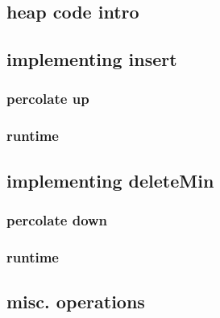 \subsection{heap code intro}



\subsection{implementing insert}



\subsubsection{percolate up}




\subsubsection{runtime}





\subsection{implementing deleteMin}



\subsubsection{percolate down}




\subsubsection{runtime}





\subsection{misc. operations}




